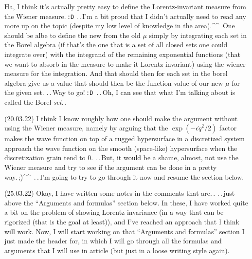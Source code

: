 \documentclass{report}
\begin{document}
Ha, I think it's actually pretty easy to define the Lorentz-invariant measure from the Wiener measure.\,\texttt{:D} .\,.\,I'm a bit proud that I didn't actually need to read any more up on the topic (despite my low level of knowledge in the area).\textasciicircum\textasciicircum\ One should be albe to define the new from the old $\mu$ simply by integrating each set in the Borel algebra (if that's the one that is a set of all closed sets one could integrate over) with the integrand of the remaining exponential functions (that we want to absorb in the measure to make it Lorentz-invariant) using the wiener measure for the integration. And that should then for each set in the borel algebra give us a value that should then be the function value of our new $\mu$ for the given set. .\,.\,Way to go!\,\texttt{:D}\, %
.\,.\,Oh, I can see that what I'm talking about is called the Borel \emph{set}.\,.

(20.03.22) I think I know roughly how one should make the argument without using the Wiener measure, namely by arguing that the $\exp(-\epsilon \dot q^2 / 2)$ factor makes the wave function on top of a rugged hypersurface in a discretized system approach the wave function on the smooth (space-like) hypersurface when the discretization grain tend to 0. .\,.\,But, it would be a shame, almost, not use the Wiener measure and try to see if the argument can be done in a pretty way.\,;)\textasciicircum\textasciicircum\ .\,.\,I'm going to try to go through it now and resume the section below. %

(25.03.22) Okay, I have written some notes in the comments that are.\,. .\,.\,just above the ``Arguments and formulas'' section below. In these, I have worked quite a bit on the problem of showing Lorentz-invariance (in a way that can be rigorized (that is the goal at least)), and I've reached an approach that I think will work. Now, I will start working on that ``Arguments and formulas'' section I just made the header for, in which I will go through all the formulas and arguments that I will use in article (but just in a loose writing style again). 
\end{document}
